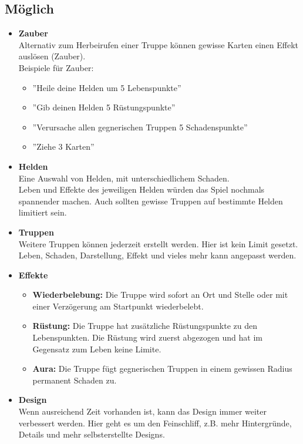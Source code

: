 \subsection{Möglich}
\begin{itemize}
    \item \textbf{Zauber} \\
        Alternativ zum Herbeirufen einer Truppe können gewisse Karten einen Effekt auslösen (Zauber).\\
        Beispiele für Zauber:
            \begin{itemize}
                \item ''Heile deine Helden um 5 Lebenspunkte''
                \item ''Gib deinen Helden 5 Rüstungspunkte''
                \item ''Verursache allen gegnerischen Truppen 5 Schadenspunkte''
                \item ''Ziehe 3 Karten''
            \end{itemize}
    \item \textbf{Helden} \\
        Eine Auswahl von Helden, mit unterschiedlichem Schaden. \\Leben und Effekte des jeweiligen Helden würden das Spiel nochmals spannender machen. Auch sollten gewisse Truppen auf bestimmte Helden limitiert sein. 
    \item \textbf{Truppen}\\
        Weitere Truppen können jederzeit erstellt werden. Hier ist kein Limit gesetzt. Leben, Schaden, Darstellung, Effekt und vieles mehr kann angepasst werden.
    \item \textbf{Effekte}
    \begin{itemize}
        \item \textbf{Wiederbelebung:}
            Die Truppe wird sofort an Ort und Stelle oder mit einer Verzögerung am Startpunkt wiederbelebt.
        \item \textbf{Rüstung:}
            Die Truppe hat zusätzliche Rüstungspunkte zu den Lebenspunkten. Die Rüstung wird zuerst abgezogen und hat im Gegensatz zum Leben keine Limite.
        \item \textbf{Aura:}
            Die Truppe fügt gegnerischen Truppen in einem gewissen Radius permanent Schaden zu.
    \end{itemize}
    \item \textbf{Design} \\
        Wenn ausreichend Zeit vorhanden ist, kann das Design immer weiter verbessert werden. Hier geht es um den Feinschliff, z.B. mehr Hintergründe, Details und mehr selbsterstellte Designs.

\end{itemize}
